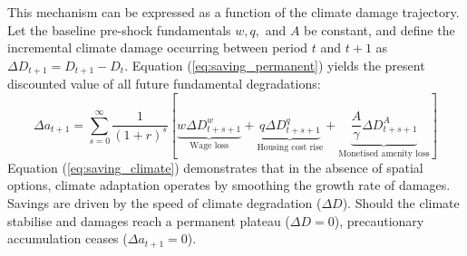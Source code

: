 \documentclass[12pt, a4paper]{article}
\begin{document}
This mechanism can be expressed as a function of the climate damage trajectory. Let the baseline pre-shock fundamentals $w, q,$ and $A$ be constant, and define the incremental climate damage occurring between period $t$ and $t+1$ as $\Delta D_{t+1} = D_{t+1} - D_t$. Equation (\ref{eq:saving_permanent}) yields the present discounted value of all future fundamental degradations:
\begin{equation}
    \Delta a_{t+1} = \sum_{s=0}^{\infty} \frac{1}{(1+r)^s} \left[ \underbrace{w \Delta D^w_{t+s+1}}_{\text{Wage loss}} + \underbrace{q \Delta D^q_{t+s+1}}_{\text{Housing cost rise}} + \underbrace{\frac{A}{\gamma} \Delta D^A_{t+s+1}}_{\text{Monetised amenity loss}} \right]
    \label{eq:saving_climate}
\end{equation}
Equation (\ref{eq:saving_climate}) demonstrates that in the absence of spatial options, climate adaptation operates by smoothing the growth rate of damages. Savings are driven by the speed of climate degradation ($\Delta D$). Should the climate stabilise and damages reach a permanent plateau ($\Delta D = 0$), precautionary accumulation ceases ($\Delta a_{t+1} = 0$).
\end{document}
